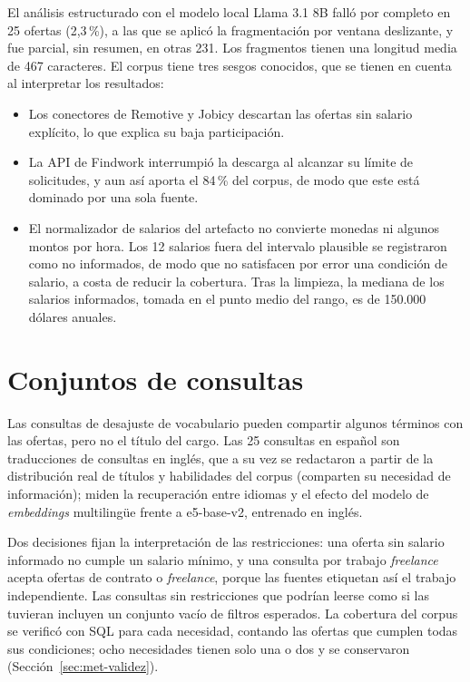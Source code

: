 El análisis estructurado con el modelo local Llama 3.1 8B falló por completo en 25 ofertas (2,3\,\%), a las que se aplicó la fragmentación por ventana deslizante, y fue parcial, sin resumen, en otras 231. Los fragmentos tienen una longitud media de 467 caracteres. El corpus tiene tres sesgos conocidos, que se tienen en cuenta al interpretar los resultados:
\begin{itemize}
    \item Los conectores de Remotive y Jobicy descartan las ofertas sin salario explícito, lo que explica su baja participación.
    \item La API de Findwork interrumpió la descarga al alcanzar su límite de solicitudes, y aun así aporta el 84\,\% del corpus, de modo que este está dominado por una sola fuente.
    \item El normalizador de salarios del artefacto no convierte monedas ni algunos montos por hora. Los 12 salarios fuera del intervalo plausible se registraron como no informados, de modo que no satisfacen por error una condición de salario, a costa de reducir la cobertura. Tras la limpieza, la mediana de los salarios informados, tomada en el punto medio del rango, es de 150.000 dólares anuales.
\end{itemize}

\section{Conjuntos de consultas}
\label{anx:consultas}

Las consultas de desajuste de vocabulario pueden compartir algunos términos con las ofertas, pero no el título del cargo. Las 25 consultas en español son traducciones de consultas en inglés, que a su vez se redactaron a partir de la distribución real de títulos y habilidades del corpus (comparten su necesidad de información); miden la recuperación entre idiomas y el efecto del modelo de \textit{embeddings} multilingüe frente a e5-base-v2, entrenado en inglés.

Dos decisiones fijan la interpretación de las restricciones: una oferta sin salario informado no cumple un salario mínimo, y una consulta por trabajo \textit{freelance} acepta ofertas de contrato o \textit{freelance}, porque las fuentes etiquetan así el trabajo independiente. Las consultas sin restricciones que podrían leerse como si las tuvieran incluyen un conjunto vacío de filtros esperados. La cobertura del corpus se verificó con SQL para cada necesidad, contando las ofertas que cumplen todas sus condiciones; ocho necesidades tienen solo una o dos y se conservaron (Sección~\ref{sec:met-validez}).

